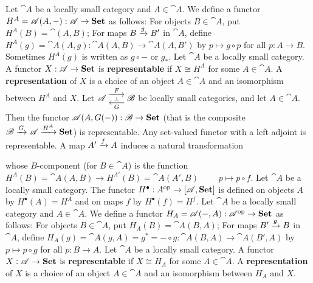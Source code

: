 Let $\cat A $ be a locally small category and $A \in \cat A$. We define a functor $H^A = \mathscr{A}(A, -): \mathscr{A} \to \operatorname{\mathbf{Set}}$ as follows:
For objects $B \in \cat A$, put $H^A(B) = \cat(A,B)$; 
For maps $B \xrightarrow[]{g} B'$ in $\cat A$, define $H^A(g) = \cat A(A,g): \cat A(A,B) \to \cat A(A, B')$ by $p \mapsto g \circ p$ for all $p: A \to B$. Sometimes $H^A(g)$ is written as $g \circ -$ or $g_*$.
 Let $\cat A$ be a locally small category. A functor $X: \mathscr{A} \to \operatorname{\mathbf{Set}}$ is \textbf{representable} if $X \cong H^A$ for some $A \in \cat A$. A \textbf{representation} of $X$ is a choice of an object $A \in \cat A$ and an isomorphism between $H^A$ and $X$.
 Let $\cat{A} \ladj{F}{G} \cat{B}$ be locally small categories, and let $A \in \cat A$. Then the functor $\mathscr{A}(A, G(-)): \mathscr{B} \to \operatorname{\mathbf{Set}}$ (that is the composite $\mathscr{B} \xrightarrow[]{G} \mathscr{A} \xrightarrow[]{H^A} \operatorname{\mathbf{Set}}$) is representable.
 Any set-valued functor with a left adjoint is representable.
 A map $A' \xrightarrow[]{f} A$ induces a natural transformation %
 whose $B$-component (for $B \in \cat A$) is the function $H^A(B) = \cat{A}(A,B) \to H^{A'}(B) = \cat{A}(A',B)\qquad$ $p \mapsto p \circ f$. 
 Let $\cat A$ be a locally small category. The functor $H^\bullet: A^{\operatorname{op}} \to [\mathscr{A}, \operatorname{\mathbf{Set}}]$ is defined on objects $A$ by $H^\bullet (A) = H^A$ and on maps $f$ by $H^\bullet(f) = H^f$.
 Let $\cat A$ be a locally small category and $A \in \cat A$. We define a functor $H_A = \mathscr{A} (-,A):\mathscr{A}^{\operatorname{op}} \to \operatorname{\mathbf{Set}}$ as follows:
For objects $B \in \cat A$, put $H_A(B) = \cat A(B,A)$; 
For maps $B' \xrightarrow[]{g} B$ in $\cat A$, define $H_A(g) = \cat A (g,A) = g^* = - \circ g : \cat A(B,A) \to \cat A (B', A)$ by $p \mapsto p \circ g$ for all $p : B \to A$.
 Let $\cat A$ be a locally small category. A functor $X: \mathscr{A} \to \operatorname{\mathbf{Set}}$ is \textbf{representable} if $X \cong H_A$ for some $A \in \cat A$. A \textbf{representation} of $X$ is a choice of an object $A \in \cat A$ and an isomorphism between $H_A$ and $X$.
